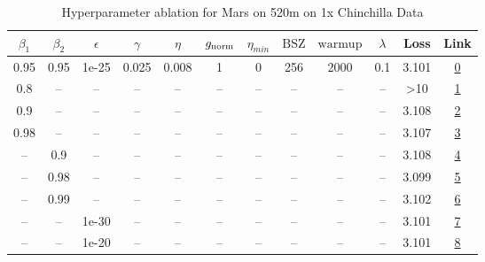 \begin{table}[H]
\centering
\caption{Hyperparameter ablation for Mars on 520m on 1x Chinchilla Data}
\label{tab:ablation_mars_520m_on_1x_chinchilla_data}
\begin{tabular}{cccccccccccc}
\toprule
$\beta_1$ & $\beta_2$ & $\epsilon$ & $\gamma$ & $\eta$ & $g_{\mathrm{norm}}$ & $\eta_{min}$ & $\mathrm{BSZ}$ & $\mathrm{warmup}$ & $\lambda$ & Loss & Link \\
\midrule
0.95 & 0.95 & 1e-25 & 0.025 & 0.008 & 1 & 0 & 256 & 2000 & 0.1 & 3.101 & \href{https://wandb.ai/marin-community/optimizer-scaling/runs/sweep-520m-10B-mars5423a5lr0.008-wd0.1-minlr0-warmup2000-b10.95--3bb28e}{0} \\
\midrule
0.8 & -- & -- & -- & -- & -- & -- & -- & -- & -- & >10 & \href{https://wandb.ai/marin-community/optimizer-scaling/runs/sweep-520m-10B-marsa9730clr0.008-wd0.1-minlr0-warmup2000-b10.8-b-076bee}{1} \\
0.9 & -- & -- & -- & -- & -- & -- & -- & -- & -- & 3.108 & \href{https://wandb.ai/marin-community/optimizer-scaling/runs/sweep-520m-10B-mars789cdclr0.008-wd0.1-minlr0-warmup2000-b10.9-b-e6ccdf}{2} \\
0.98 & -- & -- & -- & -- & -- & -- & -- & -- & -- & 3.107 & \href{https://wandb.ai/marin-community/optimizer-scaling/runs/sweep-520m-10B-mars0de768lr0.008-wd0.1-minlr0-warmup2000-b10.98--080115}{3} \\
-- & 0.9 & -- & -- & -- & -- & -- & -- & -- & -- & 3.108 & \href{https://wandb.ai/marin-community/optimizer-scaling/runs/sweep-520m-10B-mars58007elr0.008-wd0.1-minlr0-warmup2000-b10.95--235a3d}{4} \\
-- & 0.98 & -- & -- & -- & -- & -- & -- & -- & -- & 3.099 & \href{https://wandb.ai/marin-community/optimizer-scaling/runs/sweep-520m-10B-marsc95aa3lr0.008-wd0.1-minlr0-warmup2000-b10.95--142484}{5} \\
-- & 0.99 & -- & -- & -- & -- & -- & -- & -- & -- & 3.102 & \href{https://wandb.ai/marin-community/optimizer-scaling/runs/sweep-520m-10B-mars104ea4lr0.008-wd0.1-minlr0-warmup2000-b10.95--2f3096}{6} \\
-- & -- & 1e-30 & -- & -- & -- & -- & -- & -- & -- & 3.101 & \href{https://wandb.ai/marin-community/optimizer-scaling/runs/sweep-520m-10B-mars5423a5lr0.008-wd0.1-minlr0-warmup2000-b10.95--3bb28e}{7} \\
-- & -- & 1e-20 & -- & -- & -- & -- & -- & -- & -- & 3.101 & \href{https://wandb.ai/marin-community/optimizer-scaling/runs/sweep-520m-10B-mars657b86lr0.008-wd0.1-minlr0-warmup2000-b10.95--f3ff84}{8} \\

\end{tabular}
\end{table}
